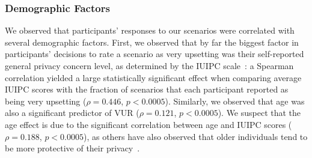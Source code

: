 \documentclass{acm_proc_article-sp}
\begin{document}


\subsubsection{Demographic Factors}

We observed that participants' responses to our scenarios were correlated with several demographic factors. First, we observed that by far the biggest factor in participants' decisions to rate a scenario as very upsetting was their self-reported general privacy concern level, as determined by the IUIPC scale~\cite{malhotra2004internet}: a Spearman correlation yielded a large statistically significant effect when comparing average IUIPC scores with the fraction of scenarios that each participant reported as being very upsetting ($\rho=0.446$, $p<0.0005$). Similarly, we observed that age was also a significant predictor of VUR ($\rho=0.121$, $p<0.0005$). We suspect that the age effect is due to the significant correlation between age and IUIPC scores ($\rho=0.188$, $p<0.0005$), as others have also observed that older individuals tend to be more protective of their privacy~\cite{varian2005demographics}.
\end{document}
